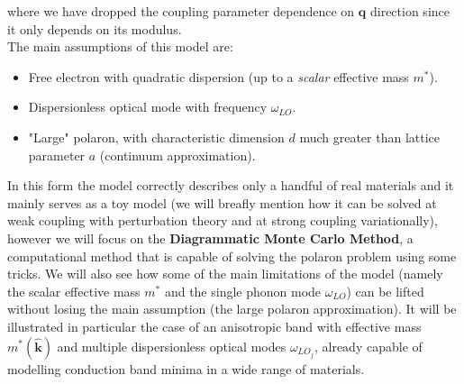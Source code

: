 where we have dropped the coupling parameter dependence on $\mathbf{q}$ direction since it only depends on its modulus.\\
The main assumptions of this model are:
\begin{itemize}
    \item Free electron with quadratic dispersion (up to a \textit{scalar} effective mass $m^*$).
    \item Dispersionless optical mode with frequency $\omega_{LO}$.
    \item "Large" polaron, with characteristic dimension $d$ much greater than lattice parameter $a$ (continuum approximation).
\end{itemize}
In this form the model correctly describes only a handful of real materials and it mainly serves as a toy model (we will breafly mention  
how it can be solved at weak coupling with perturbation theory and at strong coupling variationally), however we will focus 
on the \textbf{Diagrammatic Monte Carlo Method}, a computational method that is capable of solving the polaron problem using some tricks. 
We will also see how some of the main limitations of the model (namely the scalar effective mass $m^*$ and the single phonon mode $\omega_{LO}$) 
can be lifted without losing the main assumption (the large polaron approximation). It will be illustrated in particular the case of an 
anisotropic band with effective mass $m^*(\hat{\mathbf{k}})$ and multiple dispersionless optical modes $\omega_{LO_j}$, already capable of 
modelling conduction band minima in a wide range of materials.
